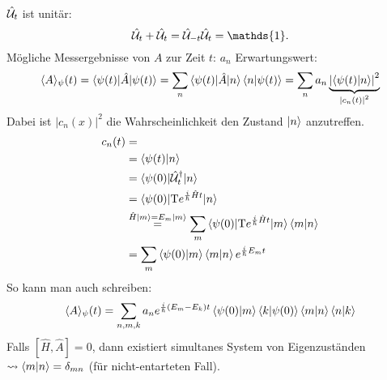 		$\hat{\mathcal{U}}_t$ ist unitär: 		
			\begin{equation*}
				\hat{\U}_t + \hat{\U}_t = \hat{\U}_{-t} \hat{\U}_t = \mathds{1}.
			\end{equation*}
		Mögliche Messergebnisse von $A$ zur Zeit $t$: $a_n$
		Erwartungswert:	
			\begin{align*}
				\langle {A} \rangle_\psi (t) = \braket{\psi(t) | \hat{A} | \psi(t)} = \sum_n \braket{\psi(t) | \hat{A} | n} \braket{n | \psi(t)} = \sum_n a_n 
				\underbrace{\left| \braket{\psi(t) | n} \right|^2}_{\substack{|c_n(t)|^2}}				
			\end{align*}
		Dabei ist $|c_n(x)|^2$ die Wahrscheinlichkeit den Zustand $\ket{n}$ anzutreffen.
			\begin{align*}
				c_n(t) &= \\
				&= \braket{\psi(t) | n} \\
				&= \braket{\psi(0) | \hat{\mathcal{U}}_t^\dagger | n} \\
				&= \braket{\psi(0) | \text{T} e^{\frac{i}{\hbar} \hat{H} t} | n} \\
				& \overset{\hat{H}\ket{m} = E_m \ket{m}}{=} 
				\sum_m \braket{\psi(0) | \text{T} e^{ \frac{i}{\hbar} \hat{H} t} | m} \braket{m | n} \\
				&= \sum_m \braket{\psi(0) | m} \braket{m | n} e^{ \frac{i}{\hbar} E_m t}
			\end{align*}
		So kann man auch schreiben:
			\begin{equation*}
				\langle {A} \rangle_\psi (t) =
				\sum_{n,m,k} a_n e^{ \frac{i}{\hbar} (E_m - E_k) t} 
				\braket{\psi(0) | m} \braket{k | \psi(0)} \braket{m | n} \braket{n | k}
			\end{equation*}
		Falls $[\hat{H} , \hat{A}] = 0$, dann existiert simultanes System von Eigenzuständen $\leadsto \braket{m | n} = \delta_{mn}$ (für nicht-entarteten Fall).